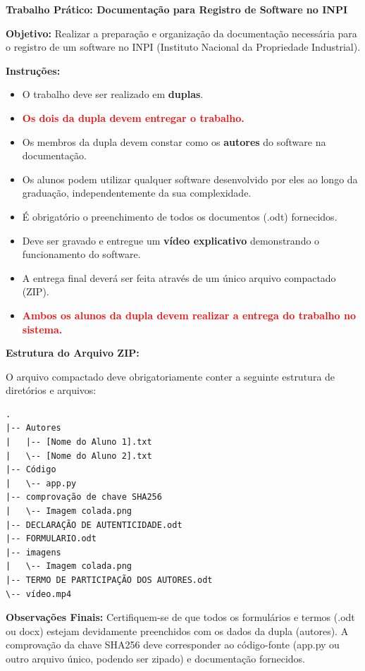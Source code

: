 \documentclass[12pt]{article}
\begin{document}
    
    \vspace*{0.2cm}
    
\begin{center}
  {\Large \textbf{Trabalho Prático: Documentação para Registro de Software no INPI}}\\[0.2cm]
\end{center}

\vspace{0.4cm}

\textbf{Objetivo:} Realizar a preparação e organização da documentação necessária para o registro de um software no INPI (Instituto Nacional da Propriedade Industrial).

\textbf{Instruções:}
\begin{itemize}
    \item O trabalho deve ser realizado em \textbf{duplas}.
    \item \textcolor{red}{\textbf{Os dois da dupla devem entregar o trabalho.}}
    \item Os membros da dupla devem constar como os \textbf{autores} do software na documentação.
    \item Os alunos podem utilizar qualquer software desenvolvido por eles ao longo da graduação, independentemente da sua complexidade.
    \item É obrigatório o preenchimento de todos os documentos (.odt) fornecidos.
    \item Deve ser gravado e entregue um \textbf{vídeo explicativo} demonstrando o funcionamento do software.
    \item A entrega final deverá ser feita através de um único arquivo compactado (ZIP).
    \item \textcolor{red}{\textbf{Ambos os alunos da dupla devem realizar a entrega do trabalho no sistema.}}
\end{itemize}

\textbf{Estrutura do Arquivo ZIP:}

O arquivo compactado deve obrigatoriamente conter a seguinte estrutura de diretórios e arquivos:

\begin{verbatim}
.
|-- Autores
|   |-- [Nome do Aluno 1].txt
|   \-- [Nome do Aluno 2].txt
|-- Código
|   \-- app.py
|-- comprovação de chave SHA256
|   \-- Imagem colada.png
|-- DECLARAÇÃO DE AUTENTICIDADE.odt
|-- FORMULARIO.odt
|-- imagens
|   \-- Imagem colada.png
|-- TERMO DE PARTICIPAÇÃO DOS AUTORES.odt
\-- vídeo.mp4
\end{verbatim}

\vspace{0.4cm}

\textbf{Observações Finais:}
Certifiquem-se de que todos os formulários e termos (.odt ou docx) estejam devidamente preenchidos com os dados da dupla (autores). A comprovação da chave SHA256 deve corresponder ao código-fonte (app.py ou outro arquivo único, podendo ser zipado) e documentação fornecidos.

\end{document}
